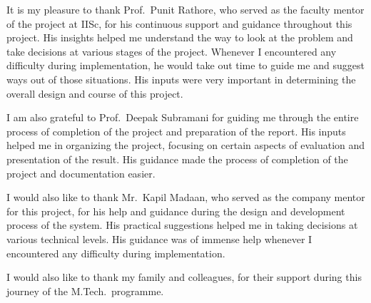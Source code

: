 It is my pleasure to thank Prof.~Punit Rathore, who served as the faculty mentor of the project at IISc, for his continuous support and guidance throughout this project. His insights helped me understand the way to look at the problem and take decisions at various stages of the project. Whenever I encountered any difficulty during implementation, he would take out time to guide me and suggest ways out of those situations. His inputs were very important in determining the overall design and course of this project.

I am also grateful to Prof.~Deepak Subramani for guiding me through the entire process of completion of the project and preparation of the report. His inputs helped me in organizing the project, focusing on certain aspects of evaluation and presentation of the result. His guidance made the process of completion of the project and documentation easier.

I would also like to thank Mr.~Kapil Madaan, who served as the company mentor for this project, for his help and guidance during the design and development process of the system. His practical suggestions helped me in taking decisions at various technical levels. His guidance was of immense help whenever I encountered any difficulty during implementation.

I would also like to thank my family and colleagues, for their support during this journey of the M.Tech.~programme.
